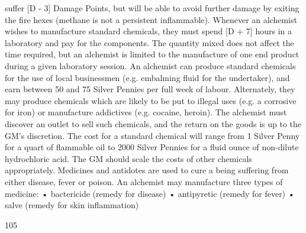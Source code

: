 \documentclass[a4paper]{article}
\begin{document}
\begin{multicols}{3}
suffer [D - 3] Damage Points, but will be able to
avoid further damage by exiting the fire hexes
(methane is not a persistent inflammable).
Whenever an alchemist wishes to manufacture
standard chemicals, they must spend [D + 7] hours
in a laboratory and pay for the components. The
quantity mixed does not affect the time required,
but an alchemist is limited to the manufacture of
one end product during a given laboratory session.
An alchemist can produce standard chemicals for
the use of local businessmen (e.g. embalming fluid
for the undertaker), and earn between 50 and 75
Silver Pennies per full week of labour. Alternately,
they may produce chemicals which are likely to be
put to illegal uses (e.g. a corrosive for iron) or
manufacture addictives (e.g. cocaine, heroin). The
alchemist must discover an outlet to sell such
chemicals, and the return on the goods is up to the
GM’s discretion.
The cost for a standard chemical will range from 1
Silver Penny for a quart of flammable oil to 2000
Silver Pennies for a fluid ounce of non-dilute hydrochloric acid. The GM should scale the costs of
other chemicals appropriately.
Medicines and antidotes are used to cure a being suffering from either disease, fever or poison.
An alchemist may manufacture three types of
medicine:
• bactericide (remedy for disease)
• antipyretic (remedy for fever)
• salve (remedy for skin inflammation)

105


\end{multicols}
\end{document}
